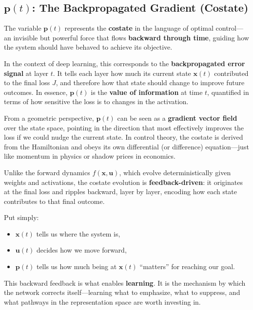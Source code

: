 \subsection{\(\mathbf{p}(t)\): The Backpropagated Gradient (Costate)}

The variable \(\mathbf{p}(t)\) represents the \textbf{costate} in the language of optimal control—an invisible but powerful force that flows \textbf{backward through time}, guiding how the system should have behaved to achieve its objective.

In the context of deep learning, this corresponds to the \textbf{backpropagated error signal} at layer \(t\). It tells each layer how much its current state \(\mathbf{x}(t)\) contributed to the final loss \(J\), and therefore how that state should change to improve future outcomes. In essence, \(\mathbf{p}(t)\) is the \textbf{value of information} at time \(t\), quantified in terms of how sensitive the loss is to changes in the activation.

From a geometric perspective, \(\mathbf{p}(t)\) can be seen as a \textbf{gradient vector field} over the state space, pointing in the direction that most effectively improves the loss if we could nudge the current state. In control theory, the costate is derived from the Hamiltonian and obeys its own differential (or difference) equation—just like momentum in physics or shadow prices in economics.

Unlike the forward dynamics \(f(\mathbf{x}, \mathbf{u})\), which evolve deterministically given weights and activations, the costate evolution is \textbf{feedback-driven}: it originates at the final loss and ripples backward, layer by layer, encoding how each state contributes to that final outcome.

\medskip
\noindent
Put simply:
\begin{itemize}
  \item \(\mathbf{x}(t)\) tells us where the system is,
  \item \(\mathbf{u}(t)\) decides how we move forward,
  \item \(\mathbf{p}(t)\) tells us how much being at \(\mathbf{x}(t)\) “matters” for reaching our goal.
\end{itemize}

This backward feedback is what enables \textbf{learning}. It is the mechanism by which the network corrects itself—learning what to emphasize, what to suppress, and what pathways in the representation space are worth investing in.



